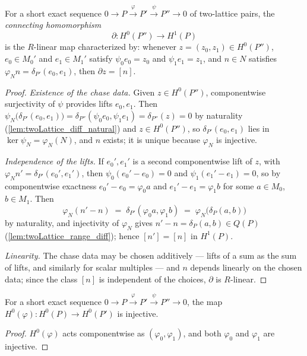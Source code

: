 \begin{definition}
  \label{def:twoLattice_delta}
  \leanok
  For a short exact sequence \(0 \to P \xrightarrow{\varphi} P' \xrightarrow{\psi}
  P'' \to 0\) of two-lattice pairs, the \emph{connecting homomorphism}
  \[
    \partial : H^0(P'') \longrightarrow H^1(P)
  \]
  is the \(R\)-linear map characterized by: whenever \(z = (z_0, z_1) \in H^0(P'')\),
  \(e_0 \in M_0'\) and \(e_1 \in M_1'\) satisfy \(\psi_0 e_0 = z_0\) and
  \(\psi_1 e_1 = z_1\), and \(n \in N\) satisfies
  \(\varphi_N n = \delta_{P'}(e_0, e_1)\), then \(\partial z = [n]\).
\end{definition}
\begin{proof}
  \leanok
  \emph{Existence of the chase data.} Given \(z \in H^0(P'')\), componentwise
  surjectivity of \(\psi\) provides lifts \(e_0, e_1\). Then
  \(\psi_N\bigl(\delta_{P'}(e_0,e_1)\bigr) = \delta_{P''}(\psi_0 e_0, \psi_1 e_1)
  = \delta_{P''}(z) = 0\) by naturality (\ref{lem:twoLattice_diff_natural}) and
  \(z \in H^0(P'')\), so \(\delta_{P'}(e_0,e_1)\) lies in \(\ker \psi_N =
  \varphi_N(N)\), and \(n\) exists; it is unique because \(\varphi_N\) is injective.

  \emph{Independence of the lifts.} If \(e_0', e_1'\) is a second componentwise lift of
  \(z\), with \(\varphi_N n' = \delta_{P'}(e_0', e_1')\), then
  \(\psi_0(e_0' - e_0) = 0\) and \(\psi_1(e_1' - e_1) = 0\), so by componentwise
  exactness \(e_0' - e_0 = \varphi_0 a\) and \(e_1' - e_1 = \varphi_1 b\) for some
  \(a \in M_0\), \(b \in M_1\). Then
  \[
    \varphi_N(n' - n) \;=\; \delta_{P'}(\varphi_0 a, \varphi_1 b)
    \;=\; \varphi_N\bigl(\delta_P(a, b)\bigr)
  \]
  by naturality, and injectivity of \(\varphi_N\) gives
  \(n' - n = \delta_P(a,b) \in Q(P)\) (\ref{lem:twoLattice_range_diff}); hence
  \([n'] = [n]\) in \(H^1(P)\).

  \emph{Linearity.} The chase data may be chosen additively --- lifts of a sum as the
  sum of lifts, and similarly for scalar multiples --- and \(n\) depends linearly on
  the chosen data; since the class \([n]\) is independent of the choices, \(\partial\)
  is \(R\)-linear.
\end{proof}

\begin{theorem}
  \label{thm:twoLattice_h0Map_injective}
  \leanok
  For a short exact sequence \(0 \to P \xrightarrow{\varphi} P' \xrightarrow{\psi}
  P'' \to 0\), the map \(H^0(\varphi) : H^0(P) \to H^0(P')\) is injective.
\end{theorem}
\begin{proof}
  \leanok
  \(H^0(\varphi)\) acts componentwise as \((\varphi_0, \varphi_1)\), and both
  \(\varphi_0\) and \(\varphi_1\) are injective.
\end{proof}

